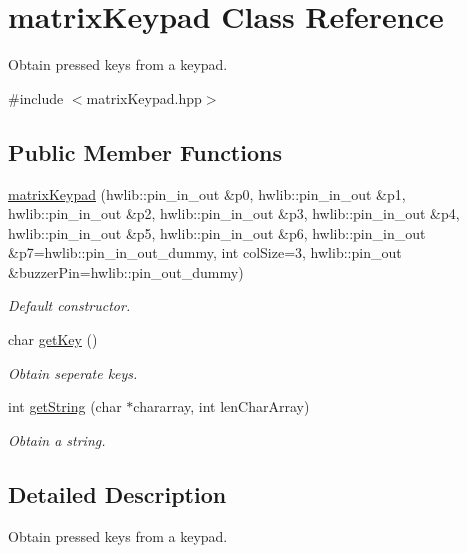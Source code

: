 \hypertarget{classmatrix_keypad}{}\section{matrix\+Keypad Class Reference}
\label{classmatrix_keypad}


Obtain pressed keys from a keypad.  




{\ttfamily \#include $<$matrix\+Keypad.\+hpp$>$}

\subsection*{Public Member Functions}
\begin{DoxyCompactItemize}
\item 
\hyperlink{classmatrix_keypad_a02a1615e9c24d0d2e1aa939420cf818f}{matrix\+Keypad} (hwlib\+::pin\+\_\+in\+\_\+out \&p0, hwlib\+::pin\+\_\+in\+\_\+out \&p1, hwlib\+::pin\+\_\+in\+\_\+out \&p2, hwlib\+::pin\+\_\+in\+\_\+out \&p3, hwlib\+::pin\+\_\+in\+\_\+out \&p4, hwlib\+::pin\+\_\+in\+\_\+out \&p5, hwlib\+::pin\+\_\+in\+\_\+out \&p6, hwlib\+::pin\+\_\+in\+\_\+out \&p7=hwlib\+::pin\+\_\+in\+\_\+out\+\_\+dummy, int col\+Size=3, hwlib\+::pin\+\_\+out \&buzzer\+Pin=hwlib\+::pin\+\_\+out\+\_\+dummy)
\begin{DoxyCompactList}\small\item\em Default constructor. \end{DoxyCompactList}\item 
char \hyperlink{classmatrix_keypad_adb0562ac12409dd390afe759297d7a95}{get\+Key} ()
\begin{DoxyCompactList}\small\item\em Obtain seperate keys. \end{DoxyCompactList}\item 
int \hyperlink{classmatrix_keypad_a85cb23086207b678f0a64f160d607c5d}{get\+String} (char $\ast$chararray, int len\+Char\+Array)
\begin{DoxyCompactList}\small\item\em Obtain a string. \end{DoxyCompactList}\end{DoxyCompactItemize}


\subsection{Detailed Description}
Obtain pressed keys from a keypad. 


